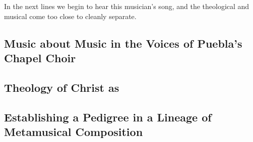 In the next lines we begin to hear this musician's song, and the theological and
musical come too close to cleanly separate.












\subsection{Music about Music in the Voices of Puebla's Chapel Choir}

\subsection{Theology of Christ as }

\subsection{Establishing a Pedigree in a Lineage of Metamusical Composition}

